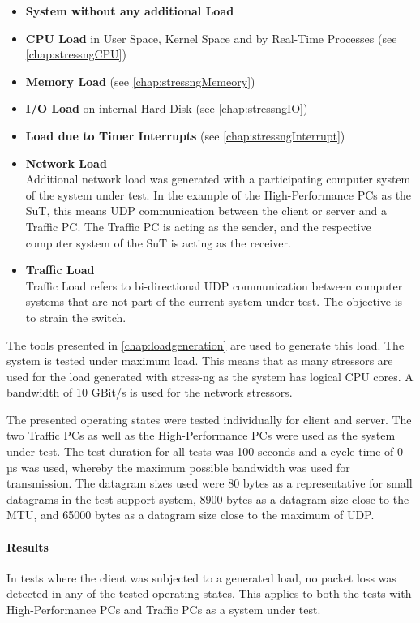 \begin{itemize}
  \item \textbf{System without any additional Load}
  \item \textbf{CPU Load} in User Space, Kernel Space and by Real-Time Processes (see \ref{chap:stressngCPU})
  \item \textbf{Memory Load} (see \ref{chap:stressngMemeory})
  \item \textbf{I/O Load} on internal Hard Disk (see \ref{chap:stressngIO})
  \item \textbf{Load due to Timer Interrupts} (see \ref{chap:stressngInterrupt})
  \item \textbf{Network Load} \\
  		Additional network load was generated with a participating computer system of the system under test. In the example of the High-Performance PCs as the SuT, this means UDP communication between the client or server and a Traffic PC. The Traffic PC is acting as the sender, and the respective computer system of the SuT is acting as the receiver.
  		
  \item \textbf{Traffic Load} \\
 		Traffic Load refers to bi-directional UDP communication between computer systems that are not part of the current system under test. The objective is to strain the switch.
\end{itemize}

The tools presented in \ref{chap:loadgeneration} are used to generate this load. The system is tested under maximum load. This means that as many stressors are used for the load generated with stress-ng as the system has logical CPU cores. A bandwidth of 10 GBit/s is used for the network stressors.

The presented operating states were tested individually for client and server. The two Traffic PCs as well as the High-Performance PCs were used as the system under test. The test duration for all tests was 100 seconds and a cycle time of 0 µs was used, whereby the maximum possible bandwidth was used for transmission. The datagram sizes used were 80 bytes as a representative for small datagrams in the test support system, 8900 bytes as a datagram size close to the MTU, and 65000 bytes as a datagram size close to the maximum of UDP.

\paragraph{Results}
In tests where the client was subjected to a generated load, no packet loss was detected in any of the tested operating states. This applies to both the tests with High-Performance PCs and Traffic PCs as a system under test.

